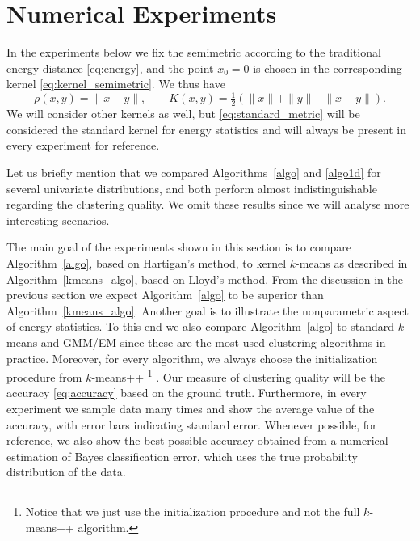 \documentclass[aps,preprint,nofootinbib,floatfix]{revtex4-1}
\newcommand\kk{K}
\begin{document}
\section{Numerical Experiments}
\label{sec:numerics}

In the experiments below we fix the semimetric 
according to the traditional energy distance \eqref{eq:energy}, and
the point $x_0=0$ is chosen in the corresponding kernel  
\eqref{eq:kernel_semimetric}. We thus have
\begin{equation}
\label{eq:standard_metric}
\rho(x,y) = \| x-y\|, \qquad \kk(x,y) = 
\tfrac{1}{2}\left( \| x \| + \| y \| - \| x-y \| \right).
\end{equation}
We will consider other kernels as well, 
but \eqref{eq:standard_metric} will be considered the
standard kernel for energy statistics and will always be present in every
experiment for reference. 

Let us briefly mention that we compared Algorithms~\ref{algo} and
\ref{algo1d} for several univariate distributions, and
both perform almost indistinguishable regarding the clustering quality.
We omit these results since we will analyse more interesting scenarios.

The main goal of the 
experiments shown in this section 
is to compare Algorithm~\ref{algo}, based on Hartigan's method, to
kernel $k$-means as described in Algorithm~\ref{kmeans_algo}, based on
Lloyd's method. From the discussion in the previous section we expect 
Algorithm~\ref{algo} to be superior than Algorithm~\ref{kmeans_algo}.
Another goal is to illustrate the nonparametric aspect of energy statistics.
To this end we also compare
Algorithm~\ref{algo} to standard $k$-means and GMM/EM since 
these are the most used
clustering algorithms in practice.
Moreover, for every algorithm, we always
choose the initialization procedure from $k$-means++%
\footnote{Notice that we just use the initialization
procedure and not the full $k$-means++ algorithm.} \cite{Vassilvitskii}.
Our measure of clustering quality will be the accuracy \eqref{eq:accuracy}
based on the ground truth. Furthermore, in every experiment we sample
data many times and show the average value of the accuracy, with error bars
indicating standard error. Whenever possible, for reference, 
we also show the best possible accuracy obtained from a numerical estimation
of Bayes classification error, which uses the true probability distribution
of the data.
\end{document}

